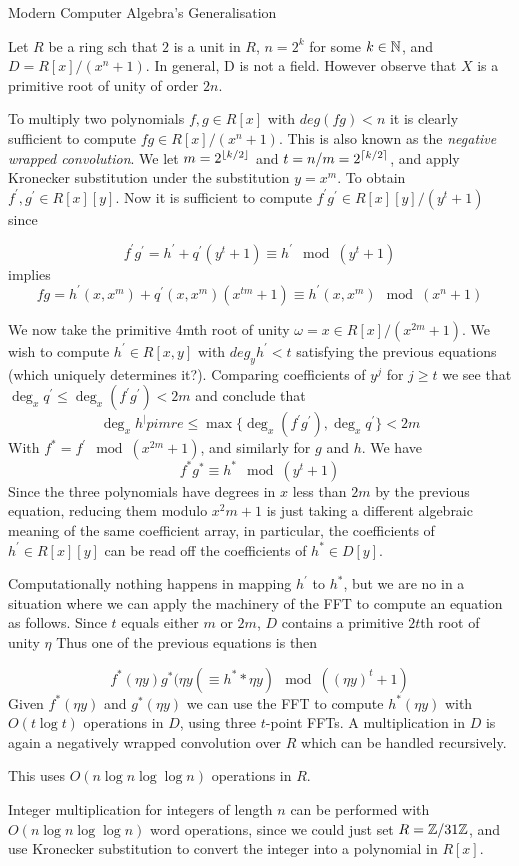 Modern Computer Algebra's Generalisation

Let $R$ be a ring sch that $2$ is a unit in $R$, $n = 2^k$ for some $k \in {\mathbb N}$, and $D = R[x] / (x^n + 1)$. In general, D is not a field. However observe that $X$ is a primitive root of unity of order $2n$. 

To multiply two polynomials $f, g \in R[x]$ with $deg(fg) < n$ it is clearly sufficient to compute $fg \in R[x] / (x^n + 1)$. This is also known as the \textit{negative wrapped convolution}. We let $m = 2^{\left \lfloor k / 2 \right \rfloor}$ and $t = n/m = 2^{\left \lceil k/2 \right \rceil}$, and apply Kronecker substitution under the substitution $y = x^m$. To obtain $f^\prime, g^\prime \in R[x][y]$. Now it is sufficient to compute $f^\prime g^\prime \in R[x][y] /(y^t + 1)$ since

\[
  f^\prime g^\prime = h^\prime + q^\prime (y^t + 1) \equiv h^\prime \mod (y^t + 1)
\]
implies
\[
    fg = h^\prime (x, x^m) + q^\prime(x, x^m)(x^{tm} + 1) \equiv h^\prime(x, x^m) \mod (x^n + 1)
\]

We now take the primitive 4mth root of unity $\omega = x \in R[x] / (x^{2m} + 1)$. We wish to compute $h^\prime \in R[x, y]$ with $deg_y h^\prime < t$ satisfying the previous equations (which uniquely determines it?). Comparing coefficients of $y^j$ for $j \ge t$ we see that $\deg_x q^\prime \le \deg_x (f^\prime g^\prime) < 2m$ and conclude that 
\[
    \deg_x h^|pimre \le \max \{ \deg_x(f^\prime g^\prime), \deg_x q^\prime \} < 2m
\]
With $f^\ast = f^\prime \mod (x^{2m} + 1)$, and similarly for $g$ and $h$. We have
\[
    f^\ast g^\ast \equiv h^\ast \mod (y^t + 1) 
\]
Since the three polynomials have degrees in $x$ less than $2m$ by the previous equation, reducing them modulo $x^2m + 1$ is just taking a different algebraic meaning of the same coefficient array, in particular, the coefficients of $h^\prime \in R[x][y]$ can be read off the coefficients of $h^\ast \in D[y]$.

Computationally nothing happens in mapping $h^\prime$ to $h^\ast$, but we are no in a situation where we can apply the machinery of the FFT to compute an equation as follows. Since $t$ equals either $m$ or $2m$, $D$ contains a primitive $2t$th root of unity $\eta$
Thus one of the previous equations is then

\[
    f^\ast(\eta y)g^\ast(\eta y( \equiv h^\ast*\eta y) \mod ((\eta y)^t + 1)
\]
Given $f^\ast(\eta y)$ and $g^\ast(\eta y)$ we can use the FFT to compute $h^\ast(\eta y)$ with $O(t \log t)$ operations in $D$, using three $t$-point FFTs. A multiplication in $D$ is again a negatively wrapped convolution over $R$ which can be handled recursively.

This uses $O(n \log n \log \log n)$ operations in $R$.

Integer multiplication for integers of length $n$ can be performed with $O(n \log n \log \log n)$ word operations, since we could just set $R = {\mathbb Z} / 31{\mathbb Z}$, and use Kronecker substitution to convert the integer into a polynomial in $R[x]$.
